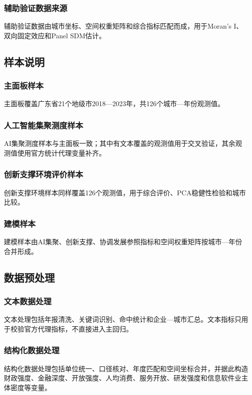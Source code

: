 \documentclass[12pt, a4paper]{ctexart}
\begin{document}
\subsubsection{辅助验证数据来源}
辅助验证数据由城市坐标、空间权重矩阵和综合指标匹配而成，用于Moran's I、双向固定效应和Panel SDM估计。

\subsection{样本说明}

\subsubsection{主面板样本}
主面板覆盖广东省21个地级市2018—2023年，共126个城市—年份观测值。

\subsubsection{人工智能集聚测度样本}
AI集聚测度样本与主面板一致；其中有文本覆盖的观测值用于交叉验证，其余观测值使用官方统计代理变量补齐。

\subsubsection{创新支撑环境评价样本}
创新支撑环境样本同样覆盖126个观测值，用于综合评价、PCA稳健性检验和城市比较。

\subsubsection{建模样本}
建模样本由AI集聚、创新支撑、协调发展参照指标和空间权重矩阵按城市—年份合并形成。

\subsection{数据预处理}

\subsubsection{文本数据处理}
文本处理包括年报清洗、关键词识别、命中统计和企业—城市汇总。文本指标只用于校验官方代理指标，不直接进入主回归。

\subsubsection{结构化数据处理}
结构化数据处理包括单位统一、口径核对、年度匹配和空间坐标合并，并据此构造财政强度、金融深度、开放强度、人均消费、服务开放、研发强度和信息软件业主体密度等变量。
\end{document}
